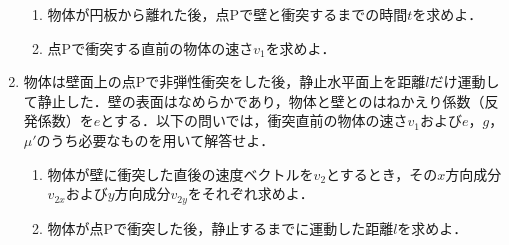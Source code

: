 \begin{enumerate}[label=\textbf{問\arabic*}]
\begin{enumerate}[(1)]
    \item {\hzw}物体が円板から離れた後，点Pで壁と衝突するまでの時間$t$を求めよ．
    \item {\hzw}点Pで衝突する直前の物体の速さ$v_1$を求めよ．
  \end{enumerate}
  \item {\hzw}物体は壁面上の点Pで非弾性衝突をした後，静止水平面上を距離$l$だけ運動して静止した．壁の表面はなめらかであり，物体と壁とのはねかえり係数（反発係数）を$e$とする．以下の問いでは，衝突直前の物体の速さ$v_1$および$e$，$g$，$\mu'$のうち必要なものを用いて解答せよ．
  \begin{enumerate}[(1)]
    \item {\hzw}物体が壁に衝突した直後の速度ベクトルを$v_2$とするとき，その$x$方向成分$v_{2x}$および$y$方向成分$v_{2y}$をそれぞれ求めよ．
    \item {\hzw}物体が点Pで衝突した後，静止するまでに運動した距離$l$を求めよ．
  \end{enumerate}
\end{enumerate}

